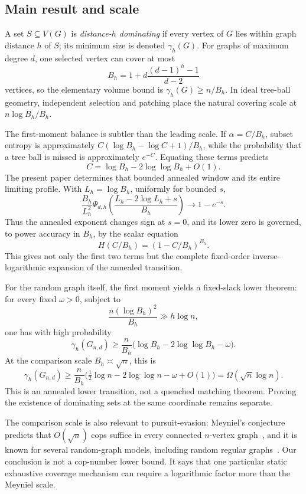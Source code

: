 \documentclass[11pt]{amsart}
\theoremstyle{definition}
\begin{document}
\subsection{Main result and scale}
A set $S\subseteq V(G)$ is \emph{distance-$h$ dominating} if every vertex of $G$ lies within graph distance $h$ of $S$; its minimum size is denoted $\gamma_h(G)$.  For graphs of maximum degree $d$, one selected vertex can cover at most
\[
 B_h=1+d\frac{(d-1)^h-1}{d-2}
\]
vertices, so the elementary volume bound is $\gamma_h(G)\ge n/B_h$.  In ideal tree-ball geometry, independent selection and patching place the natural covering scale at $n\log B_h/B_h$.

The first-moment balance is subtler than the leading scale.  If $\alpha=C/B_h$, subset entropy is approximately
$C(\log B_h-\log C+1)/B_h$, while the probability that a tree ball is missed is approximately $e^{-C}$.  Equating these terms predicts
\[
 C=\log B_h-2\log\log B_h+O(1).
\]
The present paper determines that bounded annealed window and its entire limiting profile.  With $L_h=\log B_h$, uniformly for bounded $s$,
\[
 \frac{B_h}{L_h^2}
 \Psi_{d,h}\!\left(
 \frac{L_h-2\log L_h+s}{B_h}
 \right)
 \longrightarrow 1-e^{-s}.
\]
Thus the annealed exponent changes sign at $s=0$, and its lower zero is governed, to power accuracy in $B_h$, by the scalar equation
\[
 H(C/B_h)=(1-C/B_h)^{B_h}.
\]
This gives not only the first two terms but the complete fixed-order inverse-logarithmic expansion of the annealed transition.

For the random graph itself, the first moment yields a fixed-slack lower theorem: for every fixed $\omega>0$, subject to
\[
 \frac{n(\log B_h)^2}{B_h}\gg h\log n,
\]
one has with high probability
\[
 \gamma_h(G_{n,d})\ge
 \frac n{B_h}
 \bigl(\log B_h-2\log\log B_h-\omega\bigr).
\]
At the comparison scale $B_h\asymp\sqrt n$, this is
\[
 \gamma_h(G_{n,d})\ge
 \frac n{B_h}
 \bigl(\tfrac12\log n-2\log\log n-\omega+O(1)\bigr)
 =\Omega(\sqrt n\log n).
\]
This is an annealed lower transition, not a quenched matching theorem.  Proving the existence of dominating sets at the same coordinate remains separate.

The comparison scale is also relevant to pursuit-evasion: Meyniel's conjecture predicts that $O(\sqrt n)$ cops suffice in every connected $n$-vertex graph~\cite{LuPeng2012,ScottSudakov2011}, and it is known for several random-graph models, including random regular graphs~\cite{PralatWormald2016,PralatWormald2019}.  Our conclusion is not a cop-number lower bound.  It says that one particular static exhaustive coverage mechanism can require a logarithmic factor more than the Meyniel scale.
\end{document}
